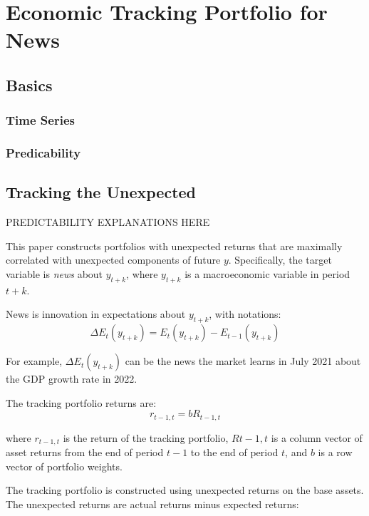 \chapter{Economic Tracking Portfolio for News}

\section{Basics}

\subsection{Time Series}

\subsection{Predicability}

\section{Tracking the Unexpected}

PREDICTABILITY EXPLANATIONS HERE

This paper constructs portfolios with unexpected returns 
that are maximally correlated with unexpected components 
of future $y$. Specifically, the target variable is \textit{news}
about $y_{t+k}$, where $y_{t+k}$ is a macroeconomic variable
in period $t+k$. 

News is innovation in expectations about $y_{t+k}$, with 
notations:
\begin{equation}
    \Delta E_t(y_{t+k}) = E_t(y_{t+k}) - E_{t-1}(y_{t+k})
\end{equation}

For example, $\Delta E_t(y_{t+k})$ can be the news the market 
learns in July 2021 about the GDP growth rate in 2022.

The tracking portfolio returns are: 
\begin{equation}
    r_{t-1,t} = bR_{t-1,t}
\end{equation}

where $r_{t-1,t}$ is the return of the tracking portfolio,
$R{t-1,t}$ is a column vector of asset returns from the end 
of period $t-1$ to the end of period $t$, and $b$ is a row 
vector of portfolio weights.

The tracking portfolio is constructed using unexpected returns 
on the base assets. The unexpected returns are actual returns 
minus expected returns:

